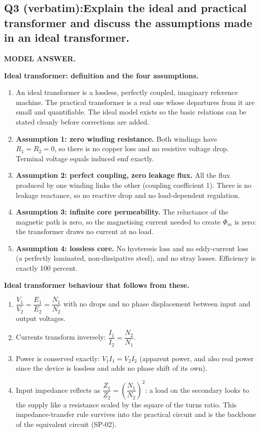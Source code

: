 \documentclass[11pt]{article}
\newcommand{\qhead}[2]{\subsection*{\color{copper}#1\quad\color{iron}#2}}
\newcommand{\tagline}[1]{\textbf{\color{copper}#1}}
\begin{document}
\qhead{Q3 (verbatim):}{Explain the ideal and practical transformer and discuss the assumptions made in an ideal transformer.}

\tagline{MODEL ANSWER.}

\textbf{Ideal transformer: definition and the four assumptions.}
\begin{enumerate}[label=\arabic*.]
\item An ideal transformer is a lossless, perfectly coupled, imaginary reference machine. The practical transformer is a real one whose departures from it are small and quantifiable. The ideal model exists so the basic relations can be stated cleanly before corrections are added.
\item \textbf{Assumption 1: zero winding resistance.} Both windings have $R_1 = R_2 = 0$, so there is no copper loss and no resistive voltage drop. Terminal voltage equals induced emf exactly.
\item \textbf{Assumption 2: perfect coupling, zero leakage flux.} All the flux produced by one winding links the other (coupling coefficient 1). There is no leakage reactance, so no reactive drop and no load-dependent regulation.
\item \textbf{Assumption 3: infinite core permeability.} The reluctance of the magnetic path is zero, so the magnetising current needed to create $\Phi_m$ is zero: the transformer draws no current at no load.
\item \textbf{Assumption 4: lossless core.} No hysteresis loss and no eddy-current loss (a perfectly laminated, non-dissipative steel), and no stray losses. Efficiency is exactly 100 percent.
\end{enumerate}

\textbf{Ideal transformer behaviour that follows from these.}
\begin{enumerate}[label=\arabic*.]
\item $\dfrac{V_1}{V_2} = \dfrac{E_1}{E_2} = \dfrac{N_1}{N_2}$ with no drops and no phase displacement between input and output voltages.
\item Currents transform inversely: $\dfrac{I_1}{I_2} = \dfrac{N_2}{N_1}$.
\item Power is conserved exactly: $V_1 I_1 = V_2 I_2$ (apparent power, and also real power since the device is lossless and adds no phase shift of its own).
\item Input impedance reflects as $\dfrac{Z_1}{Z_2} = \left(\dfrac{N_1}{N_2}\right)^{2}$: a load on the secondary looks to the supply like a resistance scaled by the square of the turns ratio. This impedance-transfer rule survives into the practical circuit and is the backbone of the equivalent circuit (SP-02).
\end{enumerate}
\end{document}
